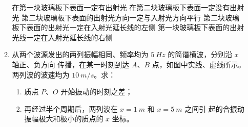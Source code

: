 \begin{enumerate}
\begin{enumerate}
\fivechoices
{在第一块玻璃板下表面一定有出射光}
{在第二块玻璃板下表面一定没有出射光}
{第二块玻璃板下表面的出射光方向一定与入射光方向平行}
{第二块玻璃板下表面的出射光一定在入射光延长线的左侧}
{第一块玻璃板下表面的出射光线一定在入射光延长线的右侧}


\item 
从两个波源发出的两列振幅相同、频率均为 $ 5 \ Hz $ 的简谐横波，分别沿 $ x $ 轴正、负方向
传播，在某一时刻到达 $ A $、$ B $ 点，如图中实线、虚线所示。
两列波的波速均为 $ 10 \ m /s $。求：
\begin{enumerate}
	\item
质点 $ P $、$ O $ 开始振动的时刻之差；
\item 
再经过半个周期后，两列波在 $ x=1 \ m $ 和 $ x=5 \ m $ 之间引
起的合振动振幅极大和极小的质点的 $ x $ 坐标。
	
\end{enumerate}
\begin{figure}[h!]
	\flushright
	
\end{figure}



	
\end{enumerate}



\end{enumerate}
